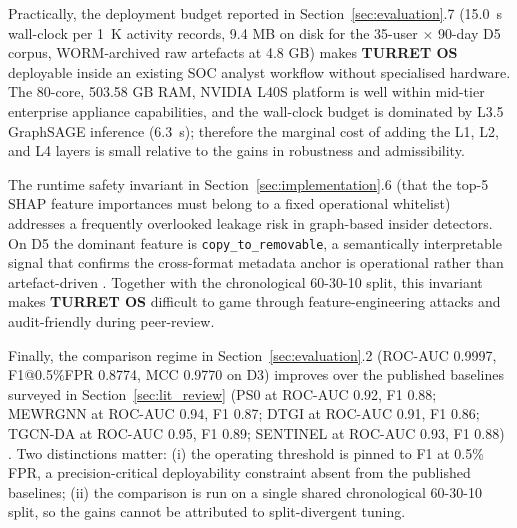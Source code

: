 Practically, the deployment budget reported in Section~\ref{sec:evaluation}.7 (15.0~s wall-clock per 1~K activity records, 9.4 MB on disk for the 35-user $\times$ 90-day D5 corpus, WORM-archived raw artefacts at 4.8 GB) makes \textbf{TURRET OS} deployable inside an existing SOC analyst workflow without specialised hardware. The 80-core, 503.58 GB RAM, NVIDIA L40S platform is well within mid-tier enterprise appliance capabilities, and the wall-clock budget is dominated by L3.5 GraphSAGE inference (6.3~s); therefore the marginal cost of adding the L1, L2, and L4 layers is small relative to the gains in robustness and admissibility.

The runtime safety invariant in Section~\ref{sec:implementation}.6 (that the top-5 SHAP feature importances must belong to a fixed operational whitelist) addresses a frequently overlooked leakage risk in graph-based insider detectors. On D5 the dominant feature is \texttt{copy\_to\_removable}, a semantically interpretable signal that confirms the cross-format metadata anchor is operational rather than artefact-driven \citep{li2021threat, mavroeidis2018framework}. Together with the chronological 60-30-10 split, this invariant makes \textbf{TURRET OS} difficult to game through feature-engineering attacks and audit-friendly during peer-review.

Finally, the comparison regime in Section~\ref{sec:evaluation}.2 (ROC-AUC 0.9997, F1@0.5\%FPR 0.8774, MCC 0.9770 on D3) improves over the published baselines surveyed in Section~\ref{sec:lit_review} (PS0 at ROC-AUC 0.92, F1 0.88; MEWRGNN at ROC-AUC 0.94, F1 0.87; DTGI at ROC-AUC 0.91, F1 0.86; TGCN-DA at ROC-AUC 0.95, F1 0.89; SENTINEL at ROC-AUC 0.93, F1 0.88) \citep{gao2023dtgi, li2023tgcnda, xiao2024sentinel, xiao2022robust}. Two distinctions matter: (i) the operating threshold is pinned to F1 at 0.5\% FPR, a precision-critical deployability constraint absent from the published baselines; (ii) the comparison is run on a single shared chronological 60-30-10 split, so the gains cannot be attributed to split-divergent tuning.
